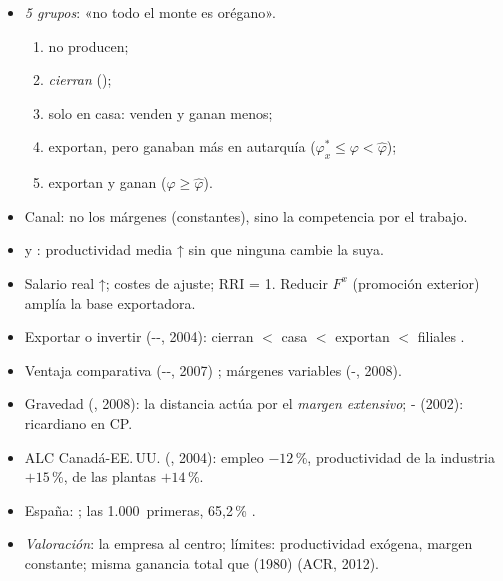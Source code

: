 \documentclass{article}
\begin{document}
\begin{columnas}
\begin{itemize}
\item \emph{5 grupos}: «no todo el monte es orégano».
  \begin{enumerate}
  \item no producen;
  \item \emph{cierran} ();
  \item solo en casa: venden y ganan menos;
  \item exportan, pero ganaban más en autarquía ($\varphi^*_x\leq\varphi<\hat\varphi$);
  \item exportan y ganan ($\varphi\geq\hat\varphi$).
  \end{enumerate}
\item Canal: no los márgenes (constantes), sino la competencia por el trabajo.
\end{itemize}
\begin{itemize}
\item {} y : productividad media ↑ sin que ninguna cambie la suya.
\item Salario real ↑; costes de ajuste; RRI = 1. Reducir $F^x$ (promoción exterior) amplía la base exportadora.
\end{itemize}
\begin{itemize}
\item Exportar o invertir (--, 2004): cierran $<$ casa $<$ exportan $<$ filiales .
\item Ventaja comparativa (--, 2007) ; márgenes variables (-, 2008).
\item Gravedad (, 2008): la distancia actúa por el \emph{margen extensivo}; - (2002): ricardiano en CP.
\end{itemize}
\begin{itemize}
\item ALC Canadá-EE.\,UU. (, 2004): empleo $-12$\,\%, productividad de la industria $+15$\,\%, de las plantas $+14$\,\%.
\item España: ; las 1.000~primeras, 65,2\,\% .
\item \emph{Valoración}: la empresa al centro; límites: productividad exógena, margen constante; misma ganancia total que  (1980) (ACR, 2012).
\end{itemize}


\end{columnas}
\end{document}
